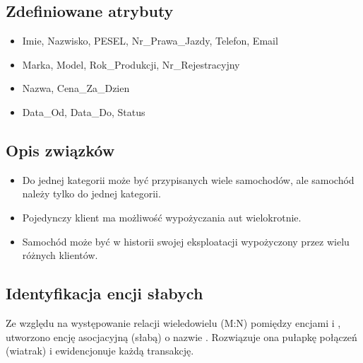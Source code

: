 \documentclass[a4paper,11pt,english,openany,oneside]{sphinxmanual}
\begin{document}
\subsection{Zdefiniowane atrybuty}
\label{\detokenize{rozdzial_3/index:zdefiniowane-atrybuty}}\begin{itemize}
\item {} 
\sphinxAtStartPar
{} Imie, Nazwisko, PESEL, Nr\_Prawa\_Jazdy, Telefon, Email

\item {} 
\sphinxAtStartPar
{} Marka, Model, Rok\_Produkcji, Nr\_Rejestracyjny

\item {} 
\sphinxAtStartPar
{} Nazwa, Cena\_Za\_Dzien

\item {} 
\sphinxAtStartPar
{} Data\_Od, Data\_Do, Status

\end{itemize}


\subsection{Opis związków}
\label{\detokenize{rozdzial_3/index:opis-zwiazkow}}\begin{itemize}
\item {} 
\sphinxAtStartPar
{} Do jednej kategorii może być przypisanych wiele samochodów, ale samochód należy tylko do jednej kategorii.

\item {} 
\sphinxAtStartPar
{} Pojedynczy klient ma możliwość wypożyczania aut wielokrotnie.

\item {} 
\sphinxAtStartPar
{} Samochód może być w historii swojej eksploatacji wypożyczony przez wielu różnych klientów.

\end{itemize}


\subsection{Identyfikacja encji słabych}
\label{\detokenize{rozdzial_3/index:identyfikacja-encji-slabych}}
\sphinxAtStartPar
Ze względu na występowanie relacji wiele\sphinxhyphen{}do\sphinxhyphen{}wielu (M:N) pomiędzy encjami  i , utworzono encję asocjacyjną (słabą) o nazwie . Rozwiązuje ona pułapkę połączeń (wiatrak) i ewidencjonuje każdą transakcję.
\end{document}
